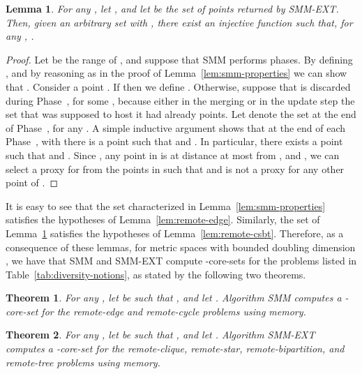 \documentclass{article}
\newtheorem{theorem}{Theorem}
\newtheorem{lemma}{Lemma}
\begin{document}
\begin{lemma}\label{lem:smm-ext-properties}
  For any , let ,
  and let  be the set of points returned by {\sc
    SMM-EXT}. Then, given an arbitrary set 
  with , there exist an injective function 
  such that, for any ,
  .
\end{lemma}
\begin{proof}
  Let  be the range of , and
  suppose that {\sc SMM} performs  phases. By
  defining , and by reasoning as in the proof
  of Lemma~\ref{lem:smm-properties} we can show that
  . Consider a point
  . If  then we define . Otherwise, suppose
  that  is discarded during Phase~, for some , because either
  in the merging or in the update step the set  that was supposed
  to host it had already  points. Let  denote the set  at
  the end of Phase~, for any . A simple inductive argument
  shows that at the end of each Phase~, with 
  there is a point  such that  and
  . In particular, there exists a point
   such that  and
  .  Since
  , any point in  is at distance at most
   from , and , we can
  select a proxy  for  from the  points in  such that
   and
   is not a proxy for any other point of .
\end{proof}

It is easy to see that the set  characterized in
Lemma~\ref{lem:smm-properties} satisfies the hypotheses of
Lemma~\ref{lem:remote-edge}. Similarly,
the set  of Lemma~\ref{lem:smm-ext-properties} satisfies the
hypotheses of Lemma~\ref{lem:remote-csbt}. Therefore, as a consequence
of these lemmas, for metric spaces with bounded doubling dimension
, we have that {\sc SMM} and {\sc SMM-EXT} compute
-core-sets for the problems listed in
Table~\ref{tab:diversity-notions}, as stated by the following two
theorems.

\begin{theorem}\label{thm:streaming-remote-edge}
  For any , let  be such that
  , and let
  . Algorithm {\sc SMM}
  computes a -core-set for the remote-edge and
  remote-cycle problems using  memory.
\end{theorem}

\begin{theorem}\label{thm:streaming-remote-clique}
For any , let  be such that
, and let . 
  Algorithm {\sc SMM-EXT} computes a
  -core-set for the remote-clique, remote-star,
  remote-bipartition, and remote-tree problems using
   memory.
\end{theorem}
\end{document}
